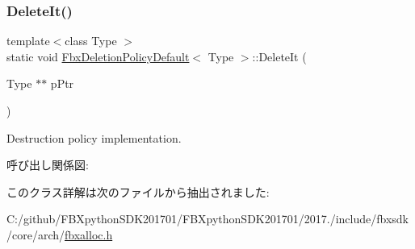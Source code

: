 \subsubsection{\texorpdfstring{Delete\+It()}{DeleteIt()}}
{\footnotesize\ttfamily template$<$class Type $>$ \\
static void \hyperlink{class_fbx_deletion_policy_default}{Fbx\+Deletion\+Policy\+Default}$<$ Type $>$\+::Delete\+It (\begin{DoxyParamCaption}\item[{Type $\ast$$\ast$}]{p\+Ptr }\end{DoxyParamCaption})\hspace{0.3cm}{\ttfamily [static]}}



Destruction policy implementation. 

呼び出し関係図\+:


このクラス詳解は次のファイルから抽出されました\+:\begin{DoxyCompactItemize}
\item 
C\+:/github/\+F\+B\+Xpython\+S\+D\+K201701/\+F\+B\+Xpython\+S\+D\+K201701/2017./include/fbxsdk/core/arch/\hyperlink{fbxalloc_8h}{fbxalloc.\+h}\end{DoxyCompactItemize}
